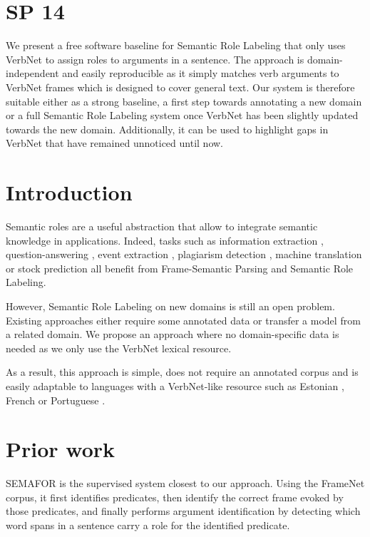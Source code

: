 \section{SP 14}

We present a free software baseline for Semantic Role Labeling that only uses
VerbNet to assign roles to arguments in a sentence. The approach is
domain-independent and easily reproducible as it simply matches verb arguments
to VerbNet frames which is designed to cover general text.  Our system is
therefore suitable either as a strong baseline, a first step towards annotating
a new domain or a full Semantic Role Labeling system once VerbNet has been
slightly updated towards the new domain. Additionally, it can be used to
highlight gaps in VerbNet that have remained unnoticed until now.

\section{Introduction}

Semantic roles are a useful abstraction that allow to integrate semantic
knowledge in applications. Indeed, tasks such as information extraction
\cite{surdeanu2003using}, question-answering \cite{shen2007using}, event
extraction \cite{exner2011using}, plagiarism detection
\cite{osman2012improved}, machine translation \cite{bazrafshan2013semantic} or
stock prediction \cite{xie2013semantic} all benefit from Frame-Semantic Parsing
and Semantic Role Labeling.

However, Semantic Role Labeling on new domains is still an open problem.
Existing approaches either require some annotated data or transfer a model from
a related domain. We propose an approach where no domain-specific data is
needed as we only use the VerbNet lexical resource.

As a result, this approach is simple, does not require an annotated corpus and
is easily adaptable to languages with a VerbNet-like resource such as Estonian
\cite{jentson2014verbnet}, French \cite{pradet2014adapting} or
Portuguese \cite{scarton2012towards}.

\section{Prior work}

SEMAFOR \cite{das2014frame} is the supervised system closest to our
approach. Using the FrameNet corpus, it first identifies predicates, then
identify the correct frame evoked by those predicates, and finally performs
argument identification by detecting which word spans in a sentence carry a
role for the identified predicate.

